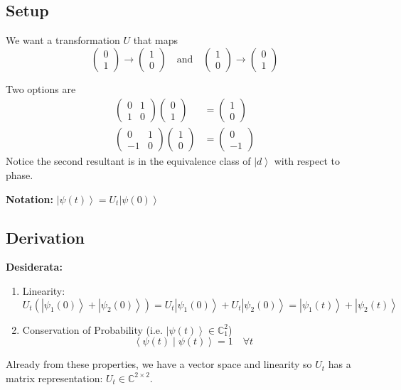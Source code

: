 \documentclass[12pt]{article}
\newcommand{\brak}[1]{\left\langle #1 \right\rangle}
\newcommand{\C}{\mathbb{C}}
\newcommand{\ket}[1]{\left\vert #1 \right\rangle}
\begin{document}
\subsection*{Setup}
We want a transformation $U$ that maps 
\[\begin{pmatrix}
    0\\1
\end{pmatrix} \to \begin{pmatrix}
    1\\0
\end{pmatrix} \quad \text{and} \quad \begin{pmatrix}
    1\\0
\end{pmatrix}\to \begin{pmatrix}
    0\\1
\end{pmatrix}\]

Two options are 
\begin{align*}
    \begin{pmatrix}
        0 & 1\\ 
        1 & 0
    \end{pmatrix}\begin{pmatrix}
        0\\1
    \end{pmatrix} &= \begin{pmatrix}
        1\\0
    \end{pmatrix}\\
    \begin{pmatrix}
        0 & 1\\ 
        -1 & 0
    \end{pmatrix}\begin{pmatrix}
        1\\0
    \end{pmatrix} &=   
    \begin{pmatrix}
        0\\-1
    \end{pmatrix} 
\end{align*}
Notice the second resultant is in the equivalence class of $\ket d$ with respect to phase. 

\textbf{Notation:} $\ket{\psi(t)} = U_t\ket{\psi(0)}$

\subsection*{Derivation}
\textbf{Desiderata:}
\begin{enumerate}
    \item Linearity:
    \[U_t (\ket{\psi_1(0)} + \ket{\psi_2(0)}) = U_t\ket{\psi_1(0)} + U_t\ket{\psi_2(0)} = \ket{\psi_1(t)} + \ket{\psi_2(t)}\]

    \item Conservation of Probability (i.e. $\ket{\psi(t)} \in \C_1^2$)
    \[\brak{\psi(t) \; | \; \psi(t)} = 1 \quad \forall t\]
\end{enumerate}
Already from these properties, we have a vector space and linearity so $U_t$ has a matrix representation: $U_t \in \C^{2 \times 2}$. 
\end{document}
